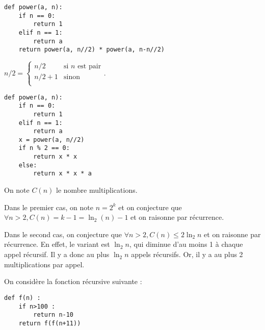 \exer{}
\setcounter{question}{0}

\ifprof
\begin{corrige}
\begin{lstlisting}
def power(a, n):
    if n == 0:
        return 1
    elif n == 1:
        return a
    return power(a, n//2) * power(a, n-n//2)
\end{lstlisting}
\end{corrige}
\else
\fi

$n/2 = \left\{ 
\begin{array}{ll} 
n/2 & \text{si }n \text{ est pair} \\
n/2+1 & \text{sinon}\\
\end{array}
\right.
$.
\ifprof
\begin{corrige}
\begin{lstlisting}
def power(a, n):
    if n == 0:
        return 1
    elif n == 1:
        return a
    x = power(a, n//2)
    if n % 2 == 0:
        return x * x
    else:
        return x * x * a
\end{lstlisting}
\end{corrige}
\else
\fi


\ifprof
\begin{corrige}
On note $C(n)$ le nombre multiplications.

Dans le premier cas, on note $n=2^k$ et on conjecture que $\forall n>2, C(n)=k-1=\ln_2 (n)-1$ et on raisonne par 
récurrence.

Dans le second cas, on conjecture que $\forall n>2, C(n)\leq 2\ln_2 n$ et on raisonne par récurrence. En effet, le 
variant est $\ln_2 n$, qui diminue d'au moins 1 à chaque appel récursif. Il y a donc au plus $\ln_2 n$ appels 
récursifs. Or, il y a au plus 2 multiplications par appel.
\end{corrige}
\else
\fi




\setcounter{question}{0}


On considère la fonction récursive suivante : 
\begin{lstlisting}
def f(n) :
    if n>100 : 
        return n-10
    return f(f(n+11))
\end{lstlisting}

